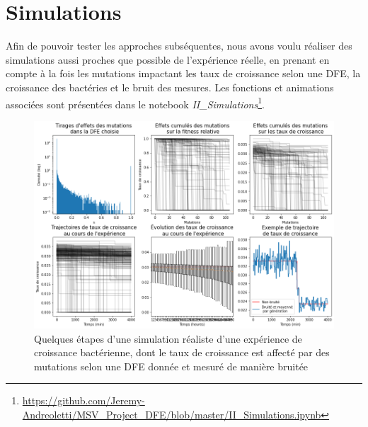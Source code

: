 \documentclass[12pt]{article}
\begin{document}
\FloatBarrier
\section{Simulations\label{s:sim}}

Afin de pouvoir tester les approches subséquentes, nous avons voulu réaliser des simulations aussi proches que possible de l'expérience réelle, en prenant en compte à la fois les mutations impactant les taux de croissance selon une DFE, la croissance des bactéries et le bruit des mesures. Les fonctions et animations associées sont présentées dans le notebook \emph{II\_Simulations}\footnote{\url{https://github.com/Jeremy-Andreoletti/MSV_Project_DFE/blob/master/II_Simulations.ipynb}}.

\begin{figure}[h]
  \begin{center}
    \vspace{3mm}
    \includegraphics[scale=0.5]{../Img/Simulations.png}
  \end{center} 
  \caption{\label{fig:simulations}Quelques étapes d'une simulation réaliste d'une expérience de croissance bactérienne, dont le taux de croissance est affecté par des mutations selon une DFE donnée et mesuré de manière bruitée}
\end{figure}
\end{document}
